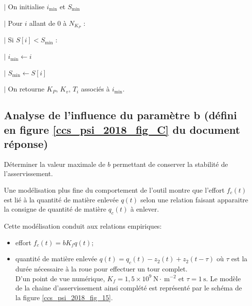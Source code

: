 \ifprof
\begin{corrige}

\noindent \hspace{.4cm} $|$ On initialise $i_{\text{min}}$ et   $S_{\text{min}}$

\noindent \hspace{.4cm} $|$ Pour $i$ allant de 0 à $N_{K_P}$ :  

\noindent \hspace{.8cm} $|$ Si $S[i]<S_{\text{min}}$ :

\noindent \hspace{1.2cm} $|$ $i_{\text{min}}\leftarrow i$

\noindent \hspace{1.2cm} $|$ $S_{\text{min}}\leftarrow S[i]$

\noindent \hspace{.4cm} $|$ On retourne  $K_P$, $K_v$, $T_i$ associés à $i_{\text{min}}$.
\end{corrige}
\else
\fi

\subsection{Analyse de l'influence du paramètre b (défini en figure \ref{ccs_psi_2018_fig_C} du document réponse)}
\begin{obj}
Déterminer la valeur maximale de $b$ permettant de conserver la stabilité de l'asservissement.
\end{obj}

Une modélisation plus fine du comportement de l'outil montre que l'effort $f_{c}(t)$ est lié à la quantité de matière enlevée $q(t)$ selon une relation faisant apparaitre la consigne de quantité de matière $q_{c}(t)$ à enlever.

Cette modélisation conduit aux relations empiriques:

\begin{itemize}
  \item effort $f_{c}(t)=b K_{f} q(t)$;
  \item quantité de matière enlevée $q(t)=q_{c}(t)-z_{2}(t)+z_{2}(t-\tau)$ où $\tau$ est la durée nécessaire à la roue pour effectuer un tour complet.\\
D'un point de vue numérique, $K_{f}=1,5 \times 10^{9} \mathrm{~N} \cdot \mathrm{~m}^{-2}$ et $\tau=1 \mathrm{~s}$. Le modèle de la chaine d'asservissement ainsi complété est représenté par le schéma de la figure \ref{ccs_psi_2018_fig_15}.
\end{itemize}


